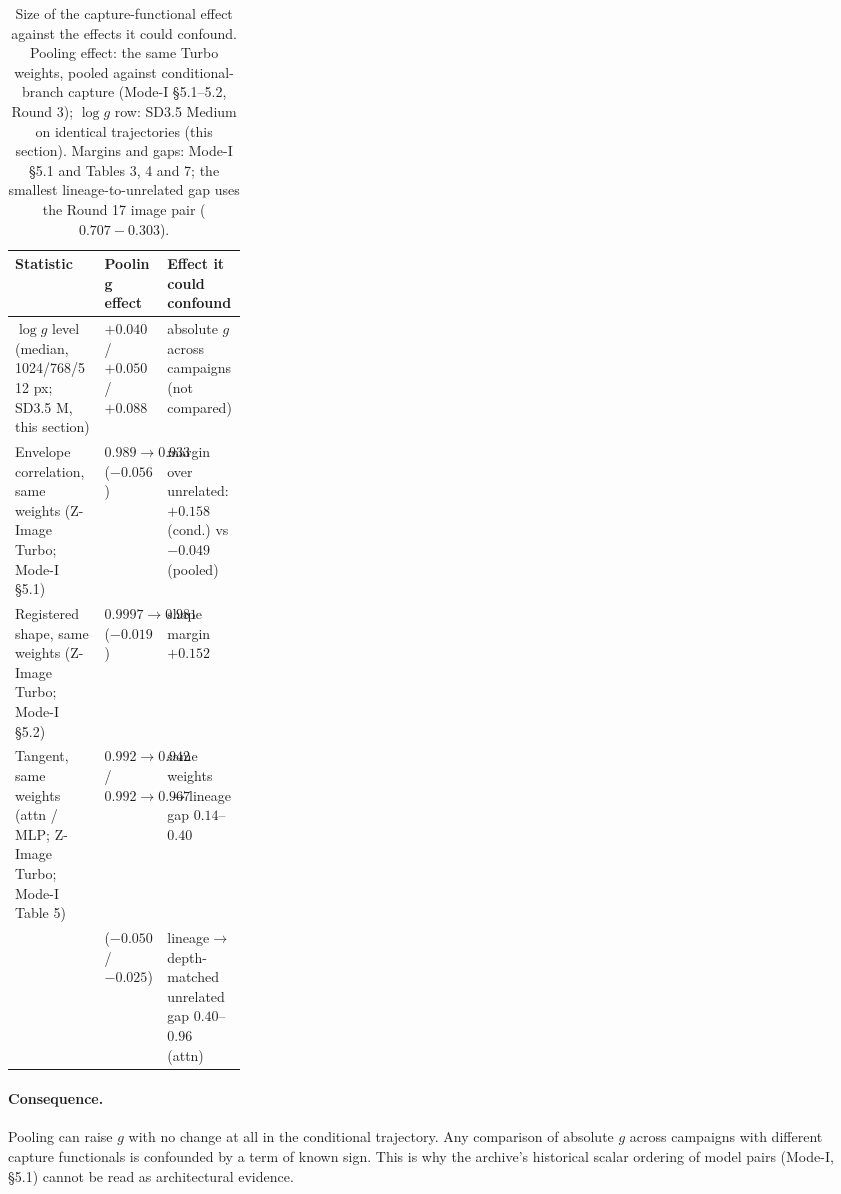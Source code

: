 \documentclass[11pt]{article}
\theoremstyle{definition}
\begin{document}
\begin{table}[htbp]
\centering\small
\caption{Size of the capture-functional effect against the effects it could confound. Pooling effect: the same Turbo weights, pooled against conditional-branch capture (Mode-I \S5.1--5.2, Round 3); $\log g$ row: SD3.5 Medium on identical trajectories (this section). Margins and gaps: Mode-I \S5.1 and Tables 3, 4 and 7; the smallest lineage-to-unrelated gap uses the Round 17 image pair ($0.707-0.303$).}
\label{tab:poolsize}
\begin{tabularx}{\linewidth}{@{}L>{\raggedright\arraybackslash}p{0.27\linewidth}L@{}}
\toprule
Statistic & Pooling effect & Effect it could confound\\
\midrule
$\log g$ level (median, 1024/768/512 px; SD3.5 M, this section) & $+0.040$ / $+0.050$ / $+0.088$ & absolute $g$ across campaigns (not compared)\\
Envelope correlation, same weights (Z-Image Turbo; Mode-I \S5.1) & $0.989\to0.933$ ($-0.056$) & margin over unrelated: $+0.158$ (cond.) vs $-0.049$ (pooled)\\
Registered shape, same weights (Z-Image Turbo; Mode-I \S5.2) & $0.9997\to0.981$ ($-0.019$) & shape margin $+0.152$\\
Tangent, same weights (attn / MLP; Z-Image Turbo; Mode-I Table 5) & $0.992\to0.942$ / $0.992\to0.967$ & same weights$\to$lineage gap $0.14$--$0.40$\\
 & ($-0.050$ / $-0.025$) & lineage$\to$depth-matched unrelated gap $0.40$--$0.96$ (attn)\\
\bottomrule
\end{tabularx}
\end{table}

\paragraph{Consequence.} Pooling can raise $g$ with no change at all in the conditional trajectory. Any comparison of absolute $g$ across campaigns with different capture functionals is confounded by a term of known sign. This is why the archive's historical scalar ordering of model pairs (Mode-I, \S5.1) cannot be read as architectural evidence.
\end{document}

